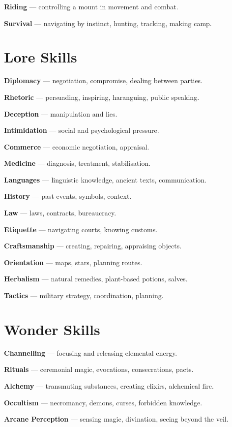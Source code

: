 \documentclass[10pt,a4paper]{article}
\begin{document}
\textbf{Riding} — controlling a mount in movement and combat.


\textbf{Survival} — navigating by instinct, hunting, tracking, making camp.


\section*{Lore Skills}

\textbf{Diplomacy} — negotiation, compromise, dealing between parties.


\textbf{Rhetoric} — persuading, inspiring, haranguing, public speaking.


\textbf{Deception} — manipulation and lies.


\textbf{Intimidation} — social and psychological pressure.


\textbf{Commerce} — economic negotiation, appraisal.


\textbf{Medicine} — diagnosis, treatment, stabilisation.


\textbf{Languages} — linguistic knowledge, ancient texts, communication.


\textbf{History} — past events, symbols, context.


\textbf{Law} — laws, contracts, bureaucracy.


\textbf{Etiquette} — navigating courts, knowing customs.


\textbf{Craftsmanship} — creating, repairing, appraising objects.


\textbf{Orientation} — maps, stars, planning routes.


\textbf{Herbalism} — natural remedies, plant-based potions, salves.


\textbf{Tactics} — military strategy, coordination, planning.


\section*{Wonder Skills}

\textbf{Channelling} — focusing and releasing elemental energy.


\textbf{Rituals} — ceremonial magic, evocations, consecrations, pacts.


\textbf{Alchemy} — transmuting substances, creating elixirs, alchemical fire.


\textbf{Occultism} — necromancy, demons, curses, forbidden knowledge.


\textbf{Arcane Perception} — sensing magic, divination, seeing beyond the veil.
\end{document}
